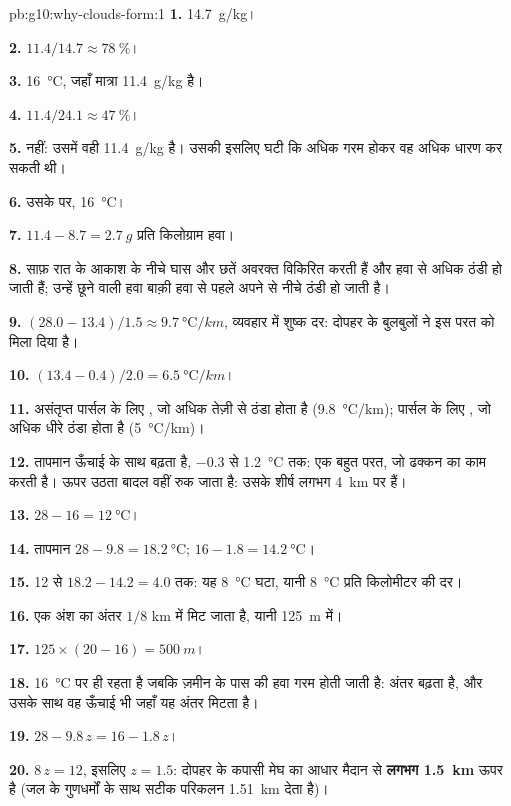 \begin{solution}{pb:g10:why-clouds-form:1}
\textbf{1.} \qty{14.7}{g/kg}।

\textbf{2.} $11.4/14.7 \approx \qty{78}{\percent}$।

\textbf{3.} \qty{16}{\degreeCelsius}, जहाँ  मात्रा
\qty{11.4}{g/kg} है।

\textbf{4.} $11.4/24.1 \approx \qty{47}{\percent}$।

\textbf{5.} नहीं: उसमें वही \qty{11.4}{g/kg} है। उसकी 
इसलिए घटी कि अधिक गरम होकर वह अधिक धारण कर सकती थी।

\textbf{6.} उसके  पर, \qty{16}{\degreeCelsius}।

\textbf{7.} $11.4 - 8.7 = \qty{2.7}{g}$ प्रति किलोग्राम हवा।

\textbf{8.} साफ़ रात के आकाश के नीचे घास और छतें अवरक्त विकिरित करती हैं और
हवा से अधिक ठंडी हो जाती हैं; उन्हें छूने वाली हवा बाक़ी हवा से पहले अपने 
से नीचे ठंडी हो जाती है।

\textbf{9.} $(28.0 - 13.4)/1.5 \approx \qty{9.7}{\degreeCelsius/km}$,
व्यवहार में शुष्क दर: दोपहर के बुलबुलों ने इस परत को मिला दिया है।

\textbf{10.} $(13.4 - 0.4)/2.0 = \qty{6.5}{\degreeCelsius/km}$।

\textbf{11.} असंतृप्त पार्सल के लिए , जो अधिक तेज़ी से ठंडा होता है
(\qty{9.8}{\degreeCelsius/km});  पार्सल के लिए , जो
अधिक धीरे ठंडा होता है (\qty{5}{\degreeCelsius/km})।

\textbf{12.} तापमान ऊँचाई के साथ बढ़ता है, \num{-0.3} से
\qty{1.2}{\degreeCelsius} तक: एक बहुत  परत, जो ढक्कन का काम करती है।
ऊपर उठता बादल वहीं रुक जाता है: उसके शीर्ष लगभग \qty{4}{km} पर हैं।

\textbf{13.} $28 - 16 = \qty{12}{\degreeCelsius}$।

\textbf{14.} तापमान $28 - 9.8 = \qty{18.2}{\degreeCelsius}$; 
$16 - 1.8 = \qty{14.2}{\degreeCelsius}$।

\textbf{15.} 12 से $18.2 - 14.2 = 4.0$ तक: यह
\qty{8}{\degreeCelsius} घटा, यानी \qty{8}{\degreeCelsius} प्रति किलोमीटर की दर।

\textbf{16.} एक अंश का अंतर $1/8$ km में मिट जाता है, यानी
\qty{125}{m} में।

\textbf{17.} $125 \times (20 - 16) = \qty{500}{m}$।

\textbf{18.}  \qty{16}{\degreeCelsius} पर ही रहता है जबकि ज़मीन के पास की हवा
गरम होती जाती है: अंतर बढ़ता है, और उसके साथ वह ऊँचाई भी जहाँ
यह अंतर मिटता है।

\textbf{19.} $28 - 9.8\,z = 16 - 1.8\,z$।

\textbf{20.} $8\,z = 12$, इसलिए $z = 1.5$: दोपहर के कपासी मेघ का आधार
मैदान से \textbf{लगभग \qty{1.5}{km}} ऊपर है (जल के गुणधर्मों के साथ सटीक परिकलन
\qty{1.51}{km} देता है)।
\end{solution}
